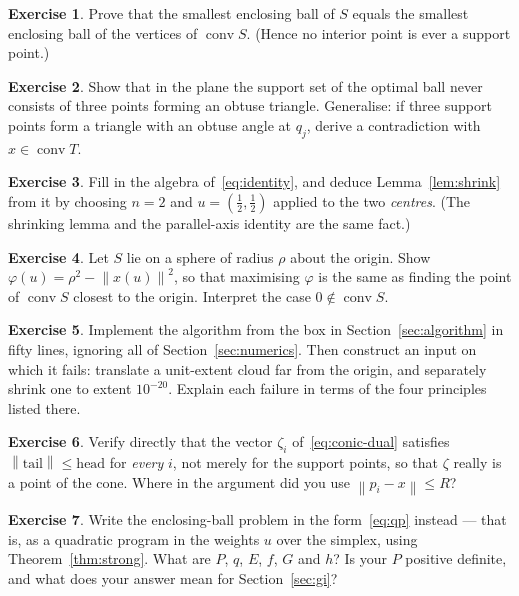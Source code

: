 \documentclass[11pt,a4paper]{article}
\theoremstyle{plain}
\theoremstyle{definition}
\newtheorem{exercise}{Exercise}
\theoremstyle{remark}
\DeclareMathOperator{\conv}{conv}
\newcommand{\norm}[1]{\left\lVert #1 \right\rVert}
\begin{document}
\begin{exercise}
  Prove that the smallest enclosing ball of $S$ equals the smallest enclosing ball
  of the vertices of $\conv S$. (Hence no interior point is ever a support point.)
\end{exercise}

\begin{exercise}
  Show that in the plane the support set of the optimal ball never consists of
  three points forming an obtuse triangle. Generalise: if three support points
  form a triangle with an obtuse angle at $q_j$, derive a contradiction with
  $x\in\conv T$.
\end{exercise}

\begin{exercise}
  Fill in the algebra of~\eqref{eq:identity}, and deduce
  Lemma~\ref{lem:shrink} from it by choosing $n=2$ and
  $u=(\tfrac12,\tfrac12)$ applied to the two \emph{centres}. (The shrinking lemma
  and the parallel-axis identity are the same fact.)
\end{exercise}

\begin{exercise}
  Let $S$ lie on a sphere of radius $\rho$ about the origin. Show
  $\varphi(u) = \rho^2 - \norm{x(u)}^2$, so that maximising $\varphi$ is the same
  as finding the point of $\conv S$ closest to the origin. Interpret the case
  $0\notin\conv S$.
\end{exercise}

\begin{exercise}
  Implement the algorithm from the box in Section~\ref{sec:algorithm} in fifty
  lines, ignoring all of Section~\ref{sec:numerics}. Then construct an input on
  which it fails: translate a unit-extent cloud far from the origin, and separately
  shrink one to extent $10^{-20}$. Explain each failure in terms of the four
  principles listed there.
\end{exercise}

\begin{exercise}
  Verify directly that the vector $\zeta_i$ of~\eqref{eq:conic-dual} satisfies
  $\norm{\text{tail}} \le \text{head}$ for \emph{every} $i$, not merely for the
  support points, so that $\zeta$ really is a point of the cone. Where in the
  argument did you use $\norm{p_i - x} \le R$?
\end{exercise}

\begin{exercise}
  Write the enclosing-ball problem in the form~\eqref{eq:qp} instead --- that is,
  as a quadratic program in the weights $u$ over the simplex, using
  Theorem~\ref{thm:strong}. What are $P$, $q$, $E$, $f$, $G$ and $h$? Is your $P$
  positive definite, and what does your answer mean for
  Section~\ref{sec:gi}?
\end{exercise}
\end{document}
